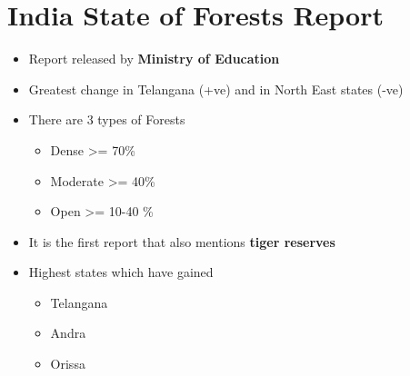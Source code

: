 \documentclass[11pt]{article}
\begin{document}
\section{India State of Forests Report}
\label{sec:org273e826}
\begin{itemize}
\item Report released by \textbf{Ministry of Education}
\item Greatest change in Telangana (+ve) and in North East states (-ve)
\item There are 3 types of Forests
\begin{itemize}
\item Dense >= 70\%
\item Moderate >= 40\%
\item Open >= 10-40 \%
\end{itemize}
\item It is the first report that also mentions \textbf{tiger reserves}
\item Highest states which have gained
\begin{itemize}
\item Telangana
\item Andra
\item Orissa
\end{itemize}
\end{itemize}
\end{document}
